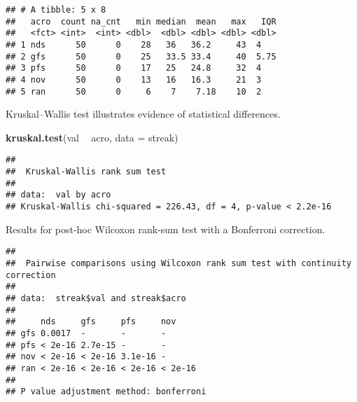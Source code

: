 \documentclass[]{book}
\newenvironment{Shaded}{\begin{snugshade}}{\end{snugshade}}
\newcommand{\DataTypeTok}[1]{\textcolor[rgb]{0.13,0.29,0.53}{#1}}
\newcommand{\KeywordTok}[1]{\textcolor[rgb]{0.13,0.29,0.53}{\textbf{#1}}}
\newcommand{\NormalTok}[1]{#1}
\newcommand{\OperatorTok}[1]{\textcolor[rgb]{0.81,0.36,0.00}{\textbf{#1}}}
\newcommand{\OtherTok}[1]{\textcolor[rgb]{0.56,0.35,0.01}{#1}}
\newcommand{\StringTok}[1]{\textcolor[rgb]{0.31,0.60,0.02}{#1}}
\begin{document}
\begin{verbatim}
## # A tibble: 5 x 8
##   acro  count na_cnt   min median  mean   max   IQR
##   <fct> <int>  <int> <dbl>  <dbl> <dbl> <dbl> <dbl>
## 1 nds      50      0    28   36   36.2     43  4   
## 2 gfs      50      0    25   33.5 33.4     40  5.75
## 3 pfs      50      0    17   25   24.8     32  4   
## 4 nov      50      0    13   16   16.3     21  3   
## 5 ran      50      0     6    7    7.18    10  2
\end{verbatim}

Kruskal--Wallis test illustrates evidence of statistical differences.

\begin{Shaded}
\begin{Highlighting}[]
\KeywordTok{kruskal.test}\NormalTok{(val }\OperatorTok{~}\StringTok{ }\NormalTok{acro, }\DataTypeTok{data =}\NormalTok{ streak)}
\end{Highlighting}
\end{Shaded}

\begin{verbatim}
## 
##  Kruskal-Wallis rank sum test
## 
## data:  val by acro
## Kruskal-Wallis chi-squared = 226.43, df = 4, p-value < 2.2e-16
\end{verbatim}

Results for post-hoc Wilcoxon rank-sum test with a Bonferroni correction.

\begin{Shaded}
\end{Shaded}

\begin{verbatim}
## 
##  Pairwise comparisons using Wilcoxon rank sum test with continuity correction 
## 
## data:  streak$val and streak$acro 
## 
##     nds     gfs     pfs     nov    
## gfs 0.0017  -       -       -      
## pfs < 2e-16 2.7e-15 -       -      
## nov < 2e-16 < 2e-16 3.1e-16 -      
## ran < 2e-16 < 2e-16 < 2e-16 < 2e-16
## 
## P value adjustment method: bonferroni
\end{verbatim}
\end{document}
